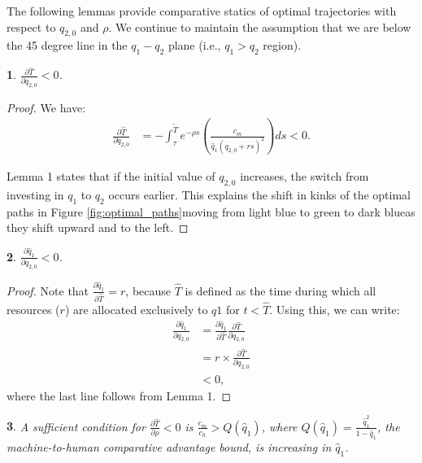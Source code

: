 \documentclass{article}
\theoremstyle{plain}
\newtheorem{lem}{\protect\lemmaname}
\newtheorem{lem}{\protect\lemmaname}[chapter]
\theoremstyle{plain}
\providecommand{\lemmaname}{Lemma}
\begin{document}
The following lemmas provide comparative statics of optimal trajectories with respect to $q_{2,0}$ and $\rho$. 
We continue to maintain the assumption that we are below the 45 degree line in the $q_{1}-q_{2}$ plane (i.e., $q_{1}>q_{2}$ region).
\begin{lem}
$\frac{\partial\hat{T}}{\partial q_{2,0}}<0$.
\end{lem}

\begin{proof}
We have:
\begin{align*}
\frac{\partial\hat{T}}{\partial q_{2,0}} & =-\int_{\tau}^{\tilde{T}}e^{-\rho s}(\frac{c_{m}}{\hat{q}_{1}(q_{2,0}+rs)^{2}})ds<0.
\end{align*}

\noindent Lemma 1 states that if the initial value of $q_{2,0}$ increases, the switch from investing in $q_{1}$ to $q_{2}$ occurs earlier. 
This explains the shift in kinks of the optimal paths in Figure \ref{fig:optimal_paths}\textendash moving from light blue to green to dark blue\textendash as they shift upward and to the left.
\end{proof}
\begin{lem}
$\frac{\partial\hat{q}_{1}}{\partial q_{2,0}}<0$.
\end{lem}

\begin{proof}
Note that $\frac{\partial\hat{q}_{1}}{\partial\hat{T}}=r$, because $\hat{T}$ is defined as the time during which all resources ($r$) are allocated exclusively to $q{1}$ for $t<\hat{T}$. 
Using this, we can write:
\begin{align*}
\frac{\partial\hat{q}_{1}}{\partial q_{2,0}} & =\frac{\partial\hat{q}_{1}}{\partial\hat{T}}\frac{\partial\hat{T}}{\partial q_{2,0}}\\
 & =r\times\frac{\partial\hat{T}}{\partial q_{2,0}}\\
 & <0,
\end{align*}
where the last line follows from Lemma 1.
\end{proof}

\begin{lem}
A sufficient condition for $\frac{\partial\hat{T}}{\partial\rho}<0$
is $\frac{c_{m}}{c_{h}}>Q(\hat{q}_{1})$, where $Q(\hat{q}_{1})=\frac{\hat{q}_{1}^{2}}{1-\hat{q}_{1}}$,
the machine-to-human comparative advantage bound, is increasing in
$\hat{q}_{1}$. 
\end{lem}
\end{document}
